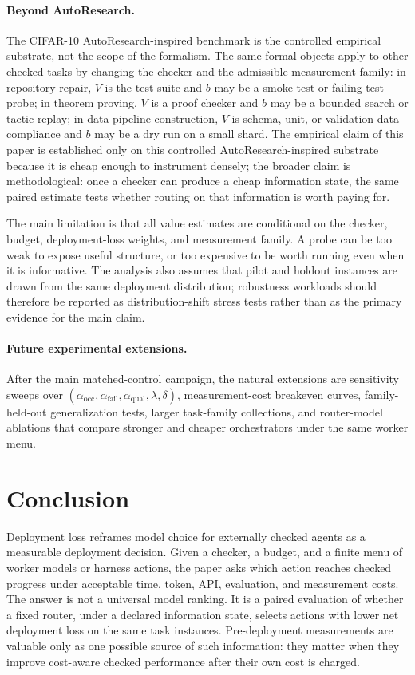 \documentclass{article}
\begin{document}
\paragraph{Beyond AutoResearch.}
The CIFAR-10 AutoResearch-inspired benchmark is the controlled empirical substrate, not the scope of the formalism.
The same formal objects apply to other checked tasks by changing the checker and the admissible measurement family: in repository repair, $V$ is the test suite and $b$ may be a smoke-test or failing-test probe; in theorem proving, $V$ is a proof checker and $b$ may be a bounded search or tactic replay; in data-pipeline construction, $V$ is schema, unit, or validation-data compliance and $b$ may be a dry run on a small shard.
The empirical claim of this paper is established only on this controlled AutoResearch-inspired substrate because it is cheap enough to instrument densely; the broader claim is methodological: once a checker can produce a cheap information state, the same paired estimate tests whether routing on that information is worth paying for.

The main limitation is that all value estimates are conditional on the checker, budget, deployment-loss weights, and measurement family.
A probe can be too weak to expose useful structure, or too expensive to be worth running even when it is informative.
The analysis also assumes that pilot and holdout instances are drawn from the same deployment distribution; robustness workloads should therefore be reported as distribution-shift stress tests rather than as the primary evidence for the main claim.

\paragraph{Future experimental extensions.}
After the main matched-control campaign, the natural extensions are sensitivity sweeps over $(\alpha_{\mathrm{occ}},\alpha_{\mathrm{fail}},\alpha_{\mathrm{qual}},\lambda,\delta)$, measurement-cost breakeven curves, family-held-out generalization tests, larger task-family collections, and router-model ablations that compare stronger and cheaper orchestrators under the same worker menu.

\section{Conclusion}
\label{sec:conclusion}

Deployment loss reframes model choice for externally checked agents as a measurable deployment decision.
Given a checker, a budget, and a finite menu of worker models or harness actions, the paper asks which action reaches checked progress under acceptable time, token, API, evaluation, and measurement costs.
The answer is not a universal model ranking.
It is a paired evaluation of whether a fixed router, under a declared information state, selects actions with lower net deployment loss on the same task instances.
Pre-deployment measurements are valuable only as one possible source of such information: they matter when they improve cost-aware checked performance after their own cost is charged.



\end{document}
